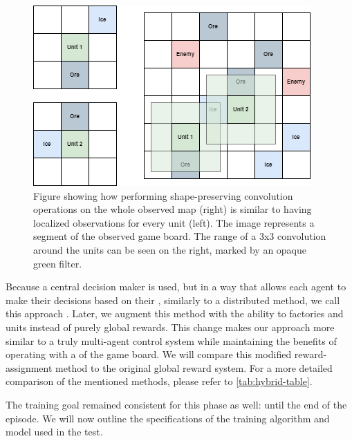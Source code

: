 \begin{figure}[htbp]
    \centering
    \includegraphics[width=0.7\linewidth]{images/methods_hybrid/feature_extractor/map.png}
    \captionsetup{justification=justified, singlelinecheck=false, width=1\linewidth, labelfont=bf} 
    \caption[]{Figure showing how performing shape-preserving convolution operations on the whole observed map (right) is similar to having localized observations for every unit (left). The image represents a segment of the observed game board. The range of a 3x3 convolution around the units can be seen on the right, marked by an opaque green filter.}
    \label{fig:map}
\end{figure}

\bigskip

\noindent Because a central decision maker is used, but in a way that allows each agent to make their decisions based on their , similarly to a distributed method, we call this approach . Later, we augment this method with the ability to  factories and units instead of purely global rewards. This change makes our approach more similar to a truly multi-agent control system while maintaining the benefits of operating with a  of the game board. We will compare this modified reward-assignment method to the original global reward system. For a more detailed comparison of the mentioned methods, please refer to \autoref{tab:hybrid-table}.

\bigskip

\noindent The training goal remained consistent for this phase as well:  until the end of the episode. We will now outline the specifications of the training algorithm and model used in the test.

